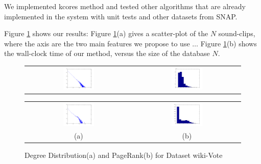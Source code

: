 We implemented kcores method
and tested other algorithms that are already implemented in the system with unit tests and other datasets from SNAP.

Figure \ref{fig:results} shows our results:
Figure \ref{fig:results}(a) gives a scatter-plot
of the $N$ sound-clips, where the axis are the two main
features we propose to use $\ldots$
Figure \ref{fig:results}(b) shows the wall-clock time
of our method, versus the size of the database $N$.

\begin{figure}[!htbf]
\begin{center}
\begin{tabular}{cc}
     \includegraphics[width=0.3\textwidth]{FIG/soc-degreedist.png} &
     \includegraphics[width=0.3\textwidth]{FIG/soc-pagerank.png} \\
\end{tabular}
\caption{Degree Distribution(a) and PageRank(b) for Dataset SOC-Epinions1}

\begin{tabular}{cc}
\includegraphics[width=0.3\textwidth]{FIG/wiki-degreedist.png} &
     \includegraphics[width=0.3\textwidth]{FIG/wiki-pagerank.png} \\

    (a) & (b) 
\end{tabular}
\caption{Degree Distribution(a) and PageRank(b) for Dataset wiki-Vote}
\label{fig:results}

\end{center}
\end{figure}

